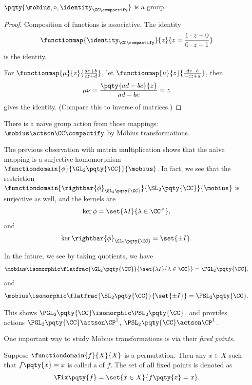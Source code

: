 \begin{theorem}
    \label{thm:mobius-group}%
    \(\pqty{\mobius, \circ, \identity_{\CC\compactify}}\) is a group.
\end{theorem}

\begin{proof}
    Composition of functions is associative. The identity
    \[
        \functionmap{\identity_{\CC\compactify}}{z}{z = \frac{1 \cdot z + 0}{0 \cdot z + 1}}
    \]
    is the identity.

    For \(\functionmap{\mu}{z}{\frac{az + b}{cz + d}}\), let \(\functionmap{\nu}{z}{\frac{dz - b}{-cz + a}}\), then
    \[
        \mu \nu = \frac{\pqty{ad - bc}{z}}{ad - bc} = z
    \]
    gives the identity. (Compare this to inverse of matrices.)
\end{proof}

There is a na\"{i}ve group action from those mappings: \(\mobius \actson \CC\compactify\) by M\"{o}bius transformations.

\begin{remark}
    The previous observation with matrix multiplication shows that the na\"{i}ve mapping is a surjective homomorphism \(\functiondomain{\phi}{\GL_{2} \pqty{\CC}}{\mobius}\). In fact, we see that the restriction \(\functiondomain{\rightbar{\phi}_{\SL_{2} \pqty{\CC}}}{\SL_{2} \pqty{\CC}}{\mobius}\) is surjective as well, and the kernels are
    \[
        \ker \phi = \set{\lambda I}{\lambda \in \CC^\times},
    \]
    and
    \[
        \ker \rightbar{\phi}_{\SL_{2} \pqty{\CC}} = \set{\pm I}.
    \]

    In the future, we see by taking quotients, we have
    \[
        \mobius \isomorphic \flatfrac{\GL_{2}\pqty{\CC}}{\set{\lambda I}{\lambda \in \CC}} = \PGL_{2} \pqty{\CC},
    \]
    and
    \[
        \mobius \isomorphic \flatfrac{\SL_{2}\pqty{\CC}}{\set{\pm I}} = \PSL_{2} \pqty{\CC}.
    \]

    This shows \(\PGL_{2} \pqty{\CC} \isomorphic \PSL_{2} \pqty{\CC}\), and provides actions \(\PGL_{2} \pqty{\CC} \actson \CP^{1}\), \(\PSL_{2} \pqty{\CC} \actson \CP^{1}\).
\end{remark}

One important way to study M\"{o}bius transformations is via their \emph{fixed points}.

\begin{definition}
    \label{def:fixed-point}%
    Suppose \(\functiondomain{f}{X}{X}\) is a permutation. Then any \(x \in X\) such that \(f\pqty{x} = x\) is called a  of \(f\). The set of all fixed points is denoted as
    \[
        \Fix\pqty{f} = \set{x \in X}{f\pqty{x} = x}.
    \]
\end{definition}

